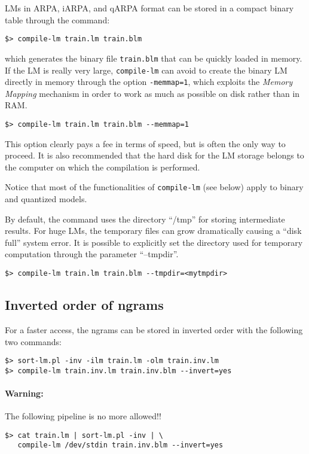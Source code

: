 LMs in ARPA, iARPA, and qARPA format can be stored in a compact binary table through the command:

\begin{verbatim}
$> compile-lm train.lm train.blm
\end{verbatim}

\noindent
which generates the binary file {\tt train.blm} that can be quickly loaded in memory.  If the LM
is really very large, {\tt compile-lm} can avoid to create the binary LM directly in memory through the 
option {\tt -memmap=1}, which exploits the {\em Memory Mapping} mechanism in order to work as 
much as possible on disk rather than in RAM. \\

\begin{verbatim}
$> compile-lm train.lm train.blm --memmap=1
\end{verbatim}
\noindent
This option clearly pays a fee  in terms of speed, but  is often the only way to proceed. It is also recommended 
that the hard disk for the LM storage belongs to the computer on which the compilation is performed.

\noindent
Notice that most of the functionalities of {\tt compile-lm} (see below) apply to binary and quantized models. 

\noindent
By default, the command uses the directory ``/tmp'' for storing
intermediate results.  For huge LMs, the temporary files can grow
dramatically causing a ``disk full'' system error.  It is possible to
explicitly set the directory used for temporary computation through the
parameter ``--tmpdir''.
\begin{verbatim}
$> compile-lm train.lm train.blm --tmpdir=<mytmpdir>
\end{verbatim}


\subsection{Inverted order of ngrams}
\label{sec:inverted-lm}
For a faster access, the ngrams can be stored in inverted order with the following two commands:
\begin{verbatim}
$> sort-lm.pl -inv -ilm train.lm -olm train.inv.lm
$> compile-lm train.inv.lm train.inv.blm --invert=yes
\end{verbatim}

\paragraph{Warning:} The following pipeline is no more allowed!!

\begin{verbatim}
$> cat train.lm | sort-lm.pl -inv | \
   compile-lm /dev/stdin train.inv.blm --invert=yes
\end{verbatim}




